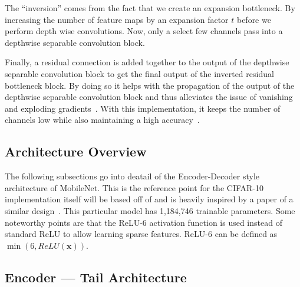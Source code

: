 \documentclass[conference]{IEEEtran}
\begin{document}
The ``inversion'' comes from the fact that we create an expansion bottleneck. By
increasing the number of feature maps by an expansion factor $t$ before we
perform depth wise convolutions. Now, only a select few channels pass into a
depthwise separable convolution block.

Finally, a residual connection is added together to the output of the depthwise
separable convolution block to get the final output of the inverted residual
bottleneck block. By doing so it helps with the propagation of the output of the
depthwise separable convolution block and thus alleviates the issue of vanishing
and exploding gradients~\cite{inverted_residual_bottleneck_blocks}. With this
implementation, it keeps the number of channels low while also maintaining a
high accuracy~\cite{mobile_net_v2_paper}.



\subsection{Architecture Overview} %

The following subsections go into deatail of the Encoder-Decoder style
architecture of MobileNet. This is the reference point for the CIFAR-10
implementation itself will be based off of and is heavily inspired by a paper of
a similar design~\cite{mobile_net_v2_paper}.  This particular model has
1,184,746 trainable parameters. Some noteworthy points are that the
ReLU-6 activation function is used instead of standard ReLU to allow learning
sparse features.  ReLU-6 can be defined as $\min(6, ReLU(\textbf{x}))$.



\subsection{Encoder --- Tail Architecture} %

\begin{table}[H]
    \centering
    \caption{MobileNet V2 tail for CIFAR 10
    dataset.}\label{table:MobileNetCifar10TailArchitecture}
\end{table}
\end{document}
